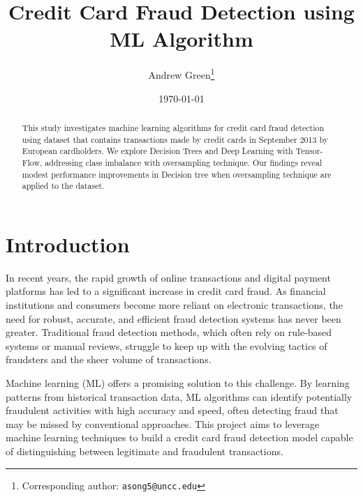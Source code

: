 \documentclass[11pt]{article}
\title{Credit Card Fraud Detection using ML Algorithm}
\author{
  Andrew Green\thanks{Corresponding author: \texttt{asong5@uncc.edu}} \\   
}
\date{\today}
\begin{document}
\maketitle

\begin{abstract}
This study investigates machine learning algorithms for credit card fraud detection
using dataset that contains transactions made by credit cards in September 2013
 by European cardholders. We explore Decision Trees and Deep Learning with Tensor-
Flow, addressing class imbalance with oversampling technique. Our findings reveal
modest performance improvements in Decision tree when oversampling technique 
are applied to the dataset.
\end{abstract}



\section{Introduction}
In recent years, the rapid growth of online transactions and digital payment platforms has led to a significant increase in credit card fraud. As financial institutions and consumers become more reliant on electronic transactions, the need for robust, accurate, and efficient fraud detection systems has never been greater. Traditional fraud detection methods, which often rely on rule-based systems or manual reviews, struggle to keep up with the evolving tactics of fraudsters and the sheer volume of transactions. 

Machine learning (ML) offers a promising solution to this challenge. By learning patterns from historical transaction data, ML algorithms can identify potentially fraudulent activities with high accuracy and speed, often detecting fraud that may be missed by conventional approaches. This project aims to leverage machine learning techniques to build a credit card fraud detection model capable of distinguishing between legitimate and fraudulent transactions.
\end{document}
